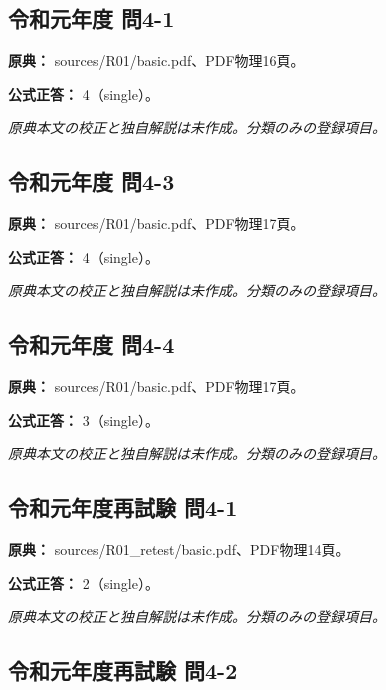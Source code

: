 \subsection{令和元年度 問4-1}
\label{q:r01-reg-basic-4-1}

\noindent\textbf{原典：} sources/R01/basic.pdf、PDF物理16頁。

\textbf{公式正答：} 4（single）。

\par\textit{原典本文の校正と独自解説は未作成。分類のみの登録項目。}

\subsection{令和元年度 問4-3}
\label{q:r01-reg-basic-4-3}

\noindent\textbf{原典：} sources/R01/basic.pdf、PDF物理17頁。

\textbf{公式正答：} 4（single）。

\par\textit{原典本文の校正と独自解説は未作成。分類のみの登録項目。}

\subsection{令和元年度 問4-4}
\label{q:r01-reg-basic-4-4}

\noindent\textbf{原典：} sources/R01/basic.pdf、PDF物理17頁。

\textbf{公式正答：} 3（single）。

\par\textit{原典本文の校正と独自解説は未作成。分類のみの登録項目。}

\subsection{令和元年度再試験 問4-1}
\label{q:r01-ret-basic-4-1}

\noindent\textbf{原典：} sources/R01\_retest/basic.pdf、PDF物理14頁。

\textbf{公式正答：} 2（single）。

\par\textit{原典本文の校正と独自解説は未作成。分類のみの登録項目。}

\subsection{令和元年度再試験 問4-2}
\label{q:r01-ret-basic-4-2}

